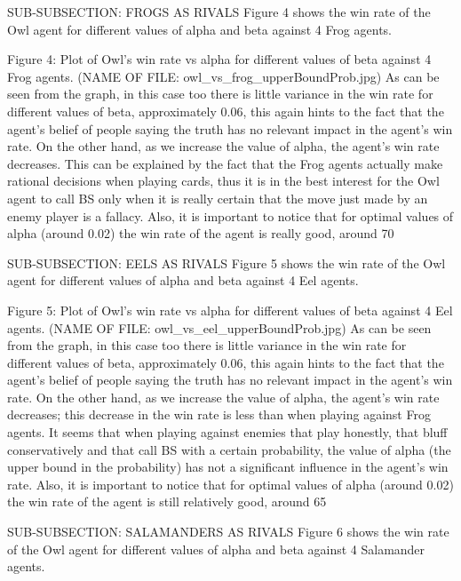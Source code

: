 \documentclass[a4paper,12pt]{article}
\begin{document}
SUB-SUBSECTION: FROGS AS RIVALS
Figure 4 shows the win rate of the Owl agent for different values of alpha and beta against 4 Frog agents.

Figure 4: Plot of Owl’s win rate vs alpha for different values of beta against 4 Frog agents. (NAME OF FILE: owl_vs_frog_upperBoundProb.jpg)
As can be seen from the graph, in this case too there is little variance in the win rate for different values of beta, approximately 0.06, this again hints to the fact that the agent’s belief of people saying the truth has no relevant impact in the agent’s win rate. On the other hand, as we increase the value of alpha, the agent’s win rate decreases. This can be explained by the fact that the Frog agents actually make rational decisions when playing cards, thus it is in the best interest for the Owl agent to call BS only when it is really certain that the move just made by an enemy player is a fallacy. Also, it is important to notice that for optimal values of alpha (around 0.02) the win rate of the agent is really good, around 70%

SUB-SUBSECTION: EELS AS RIVALS
Figure 5 shows the win rate of the Owl agent for different values of alpha and beta against 4 Eel agents.

Figure 5: Plot of Owl’s win rate vs alpha for different values of beta against 4 Eel agents. (NAME OF FILE: owl_vs_eel_upperBoundProb.jpg)
As can be seen from the graph, in this case too there is little variance in the win rate for different values of beta, approximately 0.06, this again hints to the fact that the agent’s belief of people saying the truth has no relevant impact in the agent’s win rate. On the other hand, as we increase the value of alpha, the agent’s win rate decreases; this decrease in the win rate is less than when playing against Frog agents. It seems that when playing against enemies that play honestly, that bluff conservatively and that call BS with a certain probability, the value of alpha (the upper bound in the probability) has not a significant influence in the agent’s win rate.  Also, it is important to notice that for optimal values of alpha (around 0.02) the win rate of the agent is still relatively good, around 65%

SUB-SUBSECTION: SALAMANDERS AS RIVALS
Figure 6 shows the win rate of the Owl agent for different values of alpha and beta against 4 Salamander agents.
\end{document}
